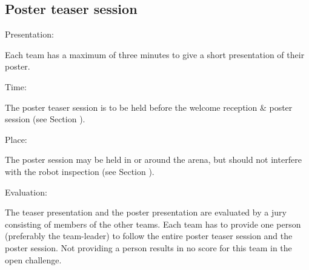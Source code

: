 \subsection{Poster teaser session}
\begin{enumerate}
	{\bf\item Presentation:} Each team has a maximum of three minutes to give a short presentation of their poster.
	{\bf\item Time:} The poster teaser session is to be held before the welcome reception \& poster session (see Section ).
	{\bf\item Place:} The poster session may be held in or around the arena, but should not interfere with the robot inspection (see Section ).
	{\bf\item Evaluation:} The teaser presentation and the poster presentation are evaluated by a jury consisting of members of the other teams. Each team has to provide one person (preferably the team-leader) to follow
	the entire poster teaser session and the poster session. Not providing a person results in no score for this team in the open challenge.


\end{enumerate}
